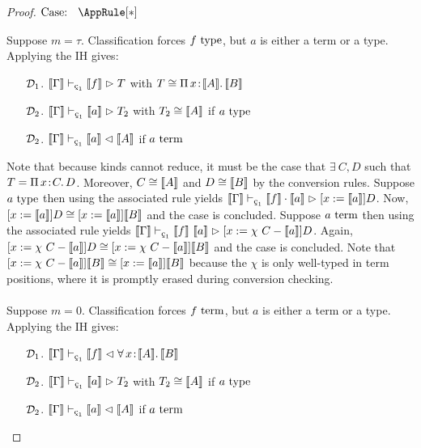 \begin{proof}
    $\text{Case: }\begin{array}{c} \AppRule[*] \end{array}$
    \begin{proofcase}
        Suppose $m = \tau$.
        Classification forces $f~\textnormal{type}$, but $a$ is either a term or a type.
        Applying the IH gives:
        \begin{enumerate}
            \item[$\mathcal{D}_{1}$.] $\sema{\Gamma} \vdash_{\oldced} \sema{f} \infr T$ with $T \cong {\Pi}\, x\! : \! \llbracket A \rrbracket.\, \llbracket B \rrbracket$
            \item[$\mathcal{D}_{2}$.] $\sema{\Gamma} \vdash_{\oldced} \sema{a} \infr T_2$ with $T_2 \cong \llbracket A \rrbracket$ if $a~\textnormal{type}$
            \item[$\mathcal{D}_{2}$.] $\sema{\Gamma} \vdash_{\oldced} \sema{a} \chck \sema{A}$ if $a~\textnormal{term}$
        \end{enumerate}
        Note that because kinds cannot reduce, it must be the case that $\exists\ C, D$ such that $T = {\Pi}\, x\! : \! C.\, D$.
        Moreover, $C \cong \llbracket A \rrbracket$ and $D \cong \llbracket B \rrbracket$ by the conversion rules.
        Suppose $a~\textnormal{type}$ then using the associated rule yields $\sema{\Gamma} \vdash_{\oldced} \sema{f} \cdot \sema{a} \infr [x := \sema{a}]D$.
        Now, $[x := \llbracket a \rrbracket]D \cong [x := \llbracket a \rrbracket]\llbracket B \rrbracket$ and the case is concluded.
        Suppose $a~\textnormal{term}$ then using the associated rule yields $\sema{\Gamma} \vdash_{\oldced} \sema{f}\ \sema{a} \infr [x := \chi\ C - \sema{a}]D$.
        Again, $[x := \chi\ C - \sema{a}]D \cong [x := \chi\ C - \sema{a}]\sema{B}$ and the case is concluded.
        Note that $[x := \chi\ C - \llbracket a \rrbracket]\llbracket B \rrbracket \cong [x := \llbracket a \rrbracket]\llbracket B \rrbracket$ because the $\chi$ is only well-typed in term positions, where it is promptly erased during conversion checking.
        \\ \\
        Suppose $m = 0$.
        Classification forces $f~\textnormal{term}$, but $a$ is either a term or a type.
        Applying the IH gives:
        \begin{enumerate}
            \item[$\mathcal{D}_{1}$.] $\sema{\Gamma} \vdash_{\oldced} \sema{f} \chck \abs{\forall}{x}{\sema{A}}{\sema{B}}$
            \item[$\mathcal{D}_{2}$.] $\sema{\Gamma} \vdash_{\oldced} \sema{a} \infr T_2$ with $T_2 \cong \llbracket A \rrbracket$ if $a~\textnormal{type}$
            \item[$\mathcal{D}_{2}$.] $\sema{\Gamma} \vdash_{\oldced} \sema{a} \chck \sema{A}$ if $a~\textnormal{term}$
        \end{enumerate}

\end{proofcase}
\end{proof}
